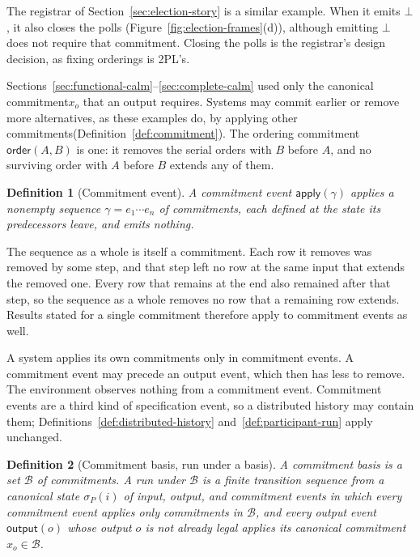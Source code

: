 \documentclass[sigconf]{cidr-2027}
\newtheorem{definition}{Definition}
\theoremstyle{remark}
\newcommand{\commitment}{commitment\xspace}
\newcommand{\commitments}{commitments\xspace}
\newcommand{\Commitment}{Commitment\xspace}
\newcommand{\outrel}{extends\xspace}          %
\begin{document}
The registrar of Section~\ref{sec:election-story} is a similar example. When
it emits $\bot$, it also closes the polls (Figure~\ref{fig:election-frames}(d)),
although emitting $\bot$ does not require that \commitment. Closing the polls is the registrar's
design decision, as fixing orderings is 2PL's.

\textcolor{reviewed}{Sections~\ref{sec:functional-calm}--\ref{sec:complete-calm} used only the
canonical \commitment $x_o$ that an output requires.} Systems may commit
earlier or remove more alternatives, as these examples do, by applying other
\commitments (Definition~\ref{def:commitment}). The ordering \commitment
$\mathsf{order}(A,B)$ is one: it removes the serial orders with $B$ before $A$,
and no surviving order with $A$ before $B$ \outrel any of them.

\begin{definition}[\Commitment event]
\label{def:commitment-event}
A \emph{\commitment event} $\mathsf{apply}(\gamma)$ applies a nonempty
sequence $\gamma=e_1\cdots e_n$ of \commitments, each defined at the state
its predecessors leave, and emits nothing.
\end{definition}

The sequence as a whole is itself a \commitment. Each row it removes was
removed by some step, and that step left no row at the same input that \outrel
the removed one. Every row that remains at the end also remained after that
step, so the sequence as a whole removes no row that a remaining row \outrel. Results stated for a single \commitment therefore apply to \commitment events
as well.

A system applies its own \commitments only in \commitment events. A \commitment event may precede an output event, which then
has less to remove. The environment observes nothing from a \commitment event. \Commitment events are a third kind of specification event, so a distributed
history may contain them; Definitions~\ref{def:distributed-history} and~\ref{def:participant-run} apply
unchanged.

\begin{definition}[\Commitment basis, run under a basis]
\label{def:commitment-basis}\label{def:run-under-basis}
A \emph{\commitment basis} is a set $\mathcal B$ of \commitments. A \emph{run
under $\mathcal B$} is a finite transition sequence from a canonical state
$\sigma_P(i)$ of input, output, and \commitment events in which every
\commitment event applies only \commitments in $\mathcal B$, and every output
event $\mathsf{output}(o)$ whose output $o$ is not already legal applies its
canonical \commitment $x_o\in\mathcal B$.
\end{definition}
\end{document}

